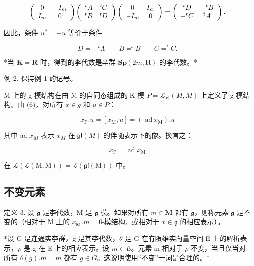 \[
\left( \begin{array}{c c} 0 & - I _ {m} \\ I _ {m} & 0 \end{array} \right) \left( \begin{array}{c c} ^ {t} A & ^ {t} C \\ ^ {t} B & ^ {t} D \end{array} \right) \left( \begin{array}{c c} 0 & I _ {m} \\ - I _ {m} & 0 \end{array} \right) = \left( \begin{array}{c c} ^ {t} D & - ^ {t} B \\ - ^ {t} C & ^ {t} A \end{array} \right).
\]

因此，条件 \(u^{*} = -u\) 等价于条件

\[
D = - ^ {t} A \qquad B = ^ {t} B \qquad C = ^ {t} C.
\]

*当 \(\mathbf{K} = \mathbf{R}\) 时，得到的李代数是辛群 \(\mathbf{Sp}(2m, \mathbf{R})\) 的李代数。*

例 2. 保持例 1 的记号。

M 上的 g-模结构在由 M 的自同态组成的 K-模 \(P = \mathcal{L}_{K}(M, M)\) 上定义了 g-模结构。由 (6)，对所有 \(x \in g\) 和 \(u \in P\)：

\[
x _ {\mathrm{P}}. u = \left[ x _ {\mathrm{M}}, u \right] = (\operatorname{ad} x _ {\mathrm{M}}). u\tag{11}
\]

其中 ad \(x_{M}\) 表示 \(x_{M}\) 在 \(\mathfrak{gl}(M)\) 的伴随表示下的像。换言之：

\[
x _ {\mathrm{P}} = \operatorname{ad} x _ {\mathrm{M}}\tag{12}
\]

在 \(\mathcal{L}(\mathcal{L}(\mathrm{M},\mathrm{M})) = \mathcal{L}(\mathfrak{gl}(\mathrm{M}))\) 中。

\subsection{不变元素}

定义 3. 设 \(\mathfrak{g}\) 是李代数，M 是 \(\mathfrak{g}\)-模。如果对所有 \(m \in \mathbf{M}\) 都有 \(\mathfrak{g}\)，则称元素 \(\mathfrak{g}\) 是不变的（相对于 M 上的 \(x_{\mathbf{M}}.m = 0\)-模结构，或相对于 \(x \in \mathfrak{g}\) 的相应表示）。

*设 G 是连通实李群，g 是其李代数，\(\theta\) 是 G 在有限维实向量空间 E 上的解析表示，\(\rho\) 是 g 在 E 上的相应表示。设 \(m \in E\)。元素 m 相对于 \(\rho\) 不变，当且仅当对所有 \(\theta(g).m = m\) 都有 \(g \in G\)。这说明使用“不变”一词是合理的。*

